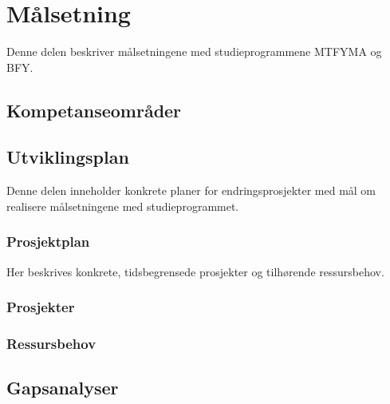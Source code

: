 \documentclass{memoir}
\begin{document}

\part{Målsetning}

Denne delen beskriver målsetningene med studieprogrammene MTFYMA og BFY.


\chapter{Kompetanseområder}






\appendix

\chapter{Utviklingsplan}

Denne delen inneholder konkrete planer for endringsprosjekter med mål om realisere målsetningene med studieprogrammet.

\section{Prosjektplan}

Her beskrives konkrete, tidsbegrensede prosjekter og tilhørende ressursbehov.

\section{Prosjekter}






\section{Ressursbehov}


\chapter{Gapsanalyser}


\end{document}
